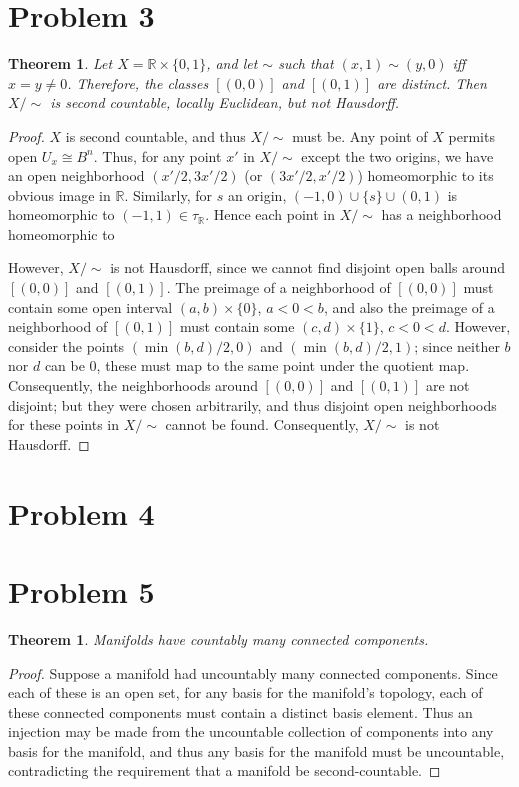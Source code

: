 \documentclass{article}
\newtheorem{theorem}[subsection]{Theorem}
\theoremstyle{definition}
\newcommand{\R}{\mathbb{R}}
\begin{document}
\section{Problem 3}
\begin{theorem}
Let $X=\R \times \{0,1\}$, and let $\sim$ such that $(x,1) \sim (y,0)$ iff 
$x=y \neq 0$. Therefore, the classes $[(0,0)]$ and $[(0,1)]$ are distinct.
Then $X / \sim$ is second countable, locally Euclidean, but not Hausdorff.
\end{theorem}
\begin{proof}
$X$ is second countable, and thus $X / \sim$ must be. Any point of $X$ 
permits open $U_x \cong B^n$. Thus, for any point $x'$ in $X/ \sim$ except
the two origins, we have an open neighborhood $(x'/2,3x'/2)$ (or 
$(3x'/2,x'/2)$) homeomorphic to its obvious image in $\R$. Similarly, 
for $s$ an origin, $(-1,0) \cup \{s\} \cup (0,1)$ is homeomorphic
to $(-1,1) \in \tau_\R$.
Hence each point in $X/\sim$ has a neighborhood homeomorphic to 

However, $X / \sim$ is not Hausdorff, since we cannot find disjoint 
open balls around $[(0,0)]$ and $[(0,1)]$. The preimage of a neighborhood
of $[(0,0)]$ must contain some open interval $(a,b) \times \{0\}$,
$a < 0 < b$,
and also the preimage of a neighborhood of $[(0,1)]$ must contain
some $(c,d) \times \{1\}$, $c < 0 < d$. However, consider the points 
$(\min(b,d)/2,0)$ and $(\min(b,d)/2,1)$; since neither $b$ nor $d$ can
be $0$, these must map to the same point under the quotient map. 
Consequently, the neighborhoods around $[(0,0)]$ and $[(0,1)]$ are
not disjoint; but they were chosen arbitrarily, and thus disjoint
open neighborhoods for these points in $X / \sim$ cannot be found.
Consequently, $X / \sim$ is not Hausdorff.
\end{proof}
\section{Problem 4}

\section{Problem 5}
\begin{theorem}
Manifolds have countably many connected components.
\end{theorem}
\begin{proof}
Suppose a manifold had uncountably many connected components. Since each
of these is an open set, for any basis for the manifold's topology, 
each of these connected components must contain a distinct basis
element. Thus an injection may be made from the uncountable collection
of components into any basis for the manifold, and thus any basis
for the manifold must be uncountable, contradicting the requirement
that a manifold be second-countable.
\end{proof}
\end{document}
